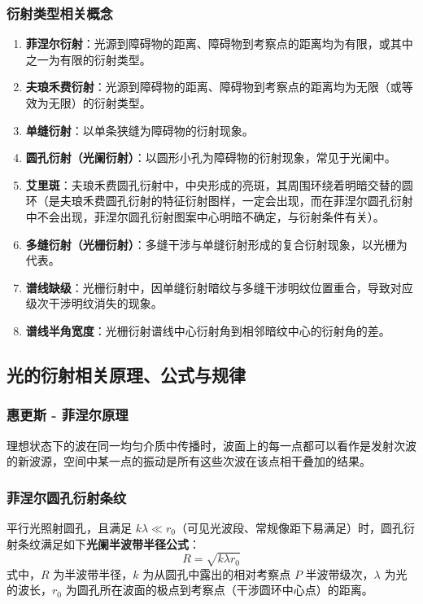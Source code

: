 \documentclass{article}
\begin{document}
	\subsubsection{衍射类型相关概念}
	\begin{enumerate}[label=\arabic*.]
		\item \textbf{菲涅尔衍射}：光源到障碍物的距离、障碍物到考察点的距离均为有限，或其中之一为有限的衍射类型。
		\item \textbf{夫琅禾费衍射}：光源到障碍物的距离、障碍物到考察点的距离均为无限（或等效为无限）的衍射类型。
		\item \textbf{单缝衍射}：以单条狭缝为障碍物的衍射现象。
		\item \textbf{圆孔衍射（光阑衍射）}：以圆形小孔为障碍物的衍射现象，常见于光阑中。
		\item \textbf{艾里斑}：夫琅禾费圆孔衍射中，中央形成的亮斑，其周围环绕着明暗交替的圆环（是夫琅禾费圆孔衍射的特征衍射图样，一定会出现，而在菲涅尔圆孔衍射中不会出现，菲涅尔圆孔衍射图案中心明暗不确定，与衍射条件有关）。
		\item \textbf{多缝衍射（光栅衍射）}：多缝干涉与单缝衍射形成的复合衍射现象，以光栅为代表。
		\item \textbf{谱线缺级}：光栅衍射中，因单缝衍射暗纹与多缝干涉明纹位置重合，导致对应级次干涉明纹消失的现象。
		\item \textbf{谱线半角宽度}：光栅衍射谱线中心衍射角到相邻暗纹中心的衍射角的差。
	\end{enumerate}
	
	\subsection{光的衍射相关原理、公式与规律}
	
	\subsubsection{惠更斯 - 菲涅尔原理}
	理想状态下的波在同一均匀介质中传播时，波面上的每一点都可以看作是发射次波的新波源，空间中某一点的振动是所有这些次波在该点相干叠加的结果。
	
	\subsubsection{菲涅尔圆孔衍射条纹}
	平行光照射圆孔，且满足 \(k\lambda\ll r_0\)（可见光波段、常规像距下易满足）时，圆孔衍射条纹满足如下\textbf{光阑半波带半径公式}：
	\[
	R = \sqrt{k\lambda r_0}
	\]
	式中，\(R\) 为半波带半径，\(k\) 为从圆孔中露出的相对考察点 \(P\) 半波带级次，\(\lambda\) 为光的波长，\(r_0\) 为圆孔所在波面的极点到考察点（干涉圆环中心点）的距离。
	
\end{document}
